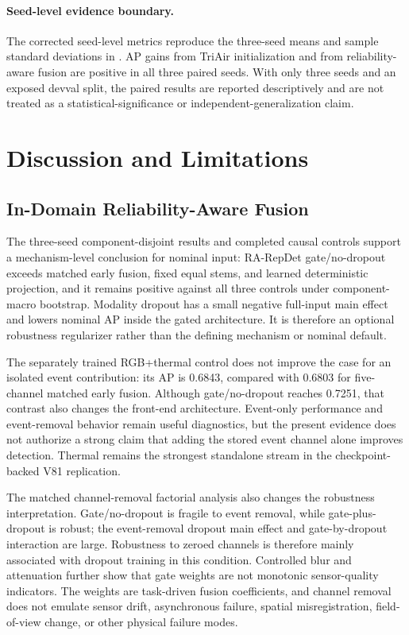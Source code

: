 \paragraph{Seed-level evidence boundary.}
The corrected seed-level metrics reproduce the three-seed means and sample standard deviations in . AP gains from TriAir initialization and from reliability-aware fusion are positive in all three paired seeds. With only three seeds and an exposed devval split, the paired results are reported descriptively and are not treated as a statistical-significance or independent-generalization claim.

\section{Discussion and Limitations}
\subsection{In-Domain Reliability-Aware Fusion}
The three-seed component-disjoint results and completed causal controls support a mechanism-level conclusion for nominal input: RA-RepDet gate/no-dropout exceeds matched early fusion, fixed equal stems, and learned deterministic projection, and it remains positive against all three controls under component-macro bootstrap. Modality dropout has a small negative full-input main effect and lowers nominal AP inside the gated architecture. It is therefore an optional robustness regularizer rather than the defining mechanism or nominal default.

The separately trained RGB+thermal control does not improve the case for an isolated event contribution: its AP is 0.6843, compared with 0.6803 for five-channel matched early fusion. Although gate/no-dropout reaches 0.7251, that contrast also changes the front-end architecture. Event-only performance and event-removal behavior remain useful diagnostics, but the present evidence does not authorize a strong claim that adding the stored event channel alone improves detection. Thermal remains the strongest standalone stream in the checkpoint-backed V81 replication.

The matched channel-removal factorial analysis also changes the robustness interpretation. Gate/no-dropout is fragile to event removal, while gate-plus-dropout is robust; the event-removal dropout main effect and gate-by-dropout interaction are large. Robustness to zeroed channels is therefore mainly associated with dropout training in this condition. Controlled blur and attenuation further show that gate weights are not monotonic sensor-quality indicators. The weights are task-driven fusion coefficients, and channel removal does not emulate sensor drift, asynchronous failure, spatial misregistration, field-of-view change, or other physical failure modes.


